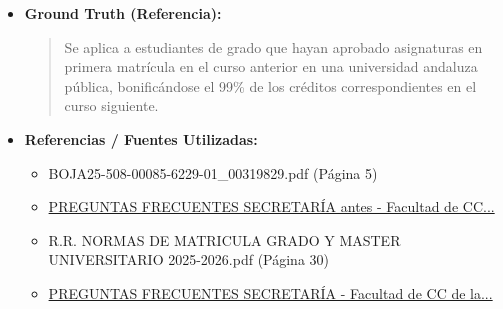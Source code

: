 \documentclass[12pt,a4paper,oneside]{report}
\begin{document}
\begin{itemize}
\begin{itemize}
\begin{quote}
\textbf{Artículos específicos:}

\begin{itemize}
  \item Artículo 10.2 de las Normas de Matrícula de Grado y Máster Universitario de la US: Límites de la bonificación.
  \item Artículo 10.3 de las Normas de Matrícula de Grado y Máster Universitario de la US: Beneficiarios de la beca de régimen general del Ministerio de Educación, Formación Profesional y Deportes.
  \item Artículo 28 de las Normas de Matrícula de Grado y Máster Universitario de la US: Reducción de precios. Exenciones y bonificaciones.
\end{itemize}

Es importante que consultes la normativa completa y actualizada en la página web de la Universidad de Sevilla o en el Boletín Oficial de la Junta de Andalucía para obtener más información y asegurarte de cumplir con los requisitos establecidos.
                \end{quote}
          \item \textbf{{Ground Truth (Referencia):}} \\
                \begin{quote}
Se aplica a estudiantes de grado que hayan aprobado asignaturas en primera matrícula en el curso anterior en una universidad andaluza pública, bonificándose el 99\% de los créditos correspondientes en el curso siguiente.
                \end{quote}
          \item \textbf{{Referencias / Fuentes Utilizadas:}} \\
                \begin{itemize}
                  \item BOJA25-508-00085-6229-01\_00319829.pdf (Página 5)
                  \item \href{https://educacion.us.es/el-centro/secretaria-administracion/secretaria/103-el-centro/1-2-secretaria-administracion/1-2-0-secretaria-del-centro/610-preguntas-frecuentes}{PREGUNTAS FRECUENTES SECRETARÍA antes - Facultad de CC...}
                  \item R.R. NORMAS DE MATRICULA GRADO Y MASTER UNIVERSITARIO 2025-2026.pdf (Página 30)
                  \item \href{https://educacion.us.es/examenes/103-el-centro/1-2-secretaria-administracion/1-2-0-secretaria-del-centro/691-preguntas-frecuentes-secretaria}{PREGUNTAS FRECUENTES SECRETARÍA - Facultad de CC de la...}

\end{itemize}
\end{itemize}
\end{itemize}
\end{document}
